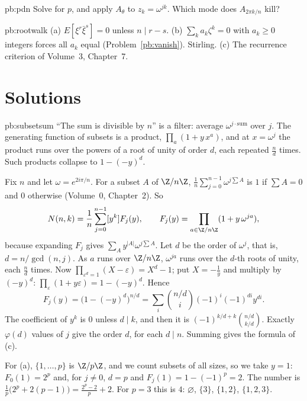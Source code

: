 \begin{hint}{pb:pdn}
Solve for $p$, and apply $A_\theta$ to $z_k=\omega^{jk}$. Which mode does $A_{2\pi k/n}$ kill?
\end{hint}

\begin{hint}{pb:rootwalk}
(a) $E[\xi^r\bar\xi^s]=0$ unless $n\mid r-s$. (b) $\sum_ka_k\zeta^k=0$ with $a_k\ge0$ integers forces all $a_k$ equal
(Problem~\ref{pb:vanish}). Stirling. (c) The recurrence criterion of Volume~3, Chapter~7.
\end{hint}

\section{Solutions}

\begin{solution}{pb:subsetsum}
\idea ``The sum is divisible by $n$'' is a filter: average $\omega^{j\cdot\text{sum}}$ over $j$. The generating function
of subsets is a product, $\prod_a(1+y\,x^a)$, and at $x=\omega^j$ the product runs over the powers of a root of unity of
order $d$, each repeated $\frac nd$ times. Such products collapse to $1-(-y)^d$.

\writeup Fix $n$ and let $\omega=e^{2i\pi/n}$. For a subset $A$ of $\Z/n\Z$, $\frac1n\sum_{j=0}^{n-1}\omega^{j\sum A}$ is $1$
if $\sum A=0$ and $0$ otherwise (Volume~0, Chapter~2). So
\[
N(n,k)=\frac1n\sum_{j=0}^{n-1}[y^k]F_j(y),\qquad F_j(y)=\prod_{a\in\Z/n\Z}(1+y\,\omega^{ja}),
\]
because expanding $F_j$ gives $\sum_Ay^{|A|}\omega^{j\sum A}$. Let $d$ be the order of $\omega^j$, that is,
$d=n/\gcd(n,j)$. As $a$ runs over $\Z/n\Z$, $\omega^{ja}$ runs over the $d$-th roots of unity, each $\frac nd$ times. Now
$\prod_{\varepsilon^d=1}(X-\varepsilon)=X^d-1$; put $X=-\frac1y$ and multiply by $(-y)^d$:
$\prod_\varepsilon(1+y\varepsilon)=1-(-y)^d$. Hence
\[
F_j(y)=\bigl(1-(-y)^d\bigr)^{n/d}=\sum_{i}\binom{n/d}i(-1)^i(-1)^{di}y^{di}.
\]
The coefficient of $y^k$ is $0$ unless $d\mid k$, and then it is $(-1)^{k/d+k}\binom{n/d}{k/d}$. Exactly $\varphi(d)$ values
of $j$ give the order $d$, for each $d\mid n$. Summing gives the formula of (c).

For (a), $\{1,\dots,p\}$ is $\Z/p\Z$, and we count subsets of all sizes, so we take $y=1$: $F_0(1)=2^p$ and, for $j\ne0$,
$d=p$ and $F_j(1)=1-(-1)^p=2$. The number is $\frac1p\bigl(2^p+2(p-1)\bigr)=\frac{2^p-2}p+2$. For $p=3$ this is $4$:
$\varnothing$, $\{3\}$, $\{1,2\}$, $\{1,2,3\}$.


\end{solution}
